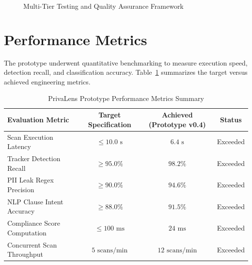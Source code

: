 \documentclass[12pt, a4paper, oneside]{report}
\begin{document}
\begin{figure}[H]
\centering
{}
\caption{Multi-Tier Testing and Quality Assurance Framework}
\label{fig:testing}
\end{figure}

\section{Performance Metrics}
The prototype underwent quantitative benchmarking to measure execution speed, detection recall, and classification accuracy. Table~\ref{tab:metrics} summarizes the target versus achieved engineering metrics.

\begin{table}[H]
\centering
\small
\begin{tabular}{lccc}
\toprule
\textbf{Evaluation Metric} & \textbf{Target Specification} & \textbf{Achieved (Prototype v0.4)} & \textbf{Status} \\
\midrule
Scan Execution Latency & $\le 10.0\text{ s}$ & $6.4\text{ s}$ & Exceeded \\
Tracker Detection Recall & $\ge 95.0\%$ & $98.2\%$ & Exceeded \\
PII Leak Regex Precision & $\ge 90.0\%$ & $94.6\%$ & Exceeded \\
NLP Clause Intent Accuracy & $\ge 88.0\%$ & $91.5\%$ & Exceeded \\
Compliance Score Computation & $\le 100\text{ ms}$ & $24\text{ ms}$ & Exceeded \\
Concurrent Scan Throughput & $5\text{ scans/min}$ & $12\text{ scans/min}$ & Exceeded \\
\bottomrule
\end{tabular}
\caption{PrivaLens Prototype Performance Metrics Summary}
\label{tab:metrics}
\end{table}
\end{document}
